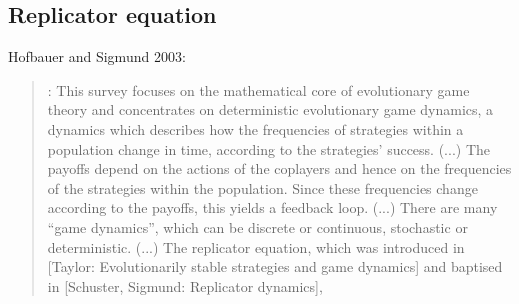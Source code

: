 \documentclass[a4paper,10pt]{article}
\begin{document}
\subsection{Replicator equation}

Hofbauer and Sigmund 2003:
\begin{quotation} \cite{hofbauer2003-evolutionaryGameDynamics}:
    This survey focuses on the mathematical core of evolutionary game theory and concentrates on deterministic evolutionary game dynamics, a dynamics which describes how the frequencies of strategies within a population change in time, according to the strategies' success.
    (...)
    The payoffs depend on the actions of the coplayers and hence on the frequencies of the strategies within the population. Since these frequencies change according to the payoffs, this yields a feedback loop.
    (...)
    There are many ``game dynamics'', which can be discrete or continuous, stochastic or deterministic.
    (...)
    The replicator equation, which was introduced in [Taylor: Evolutionarily stable strategies and game dynamics] and baptised in [Schuster, Sigmund: Replicator dynamics],
\end{quotation}

\\
\end{document}
